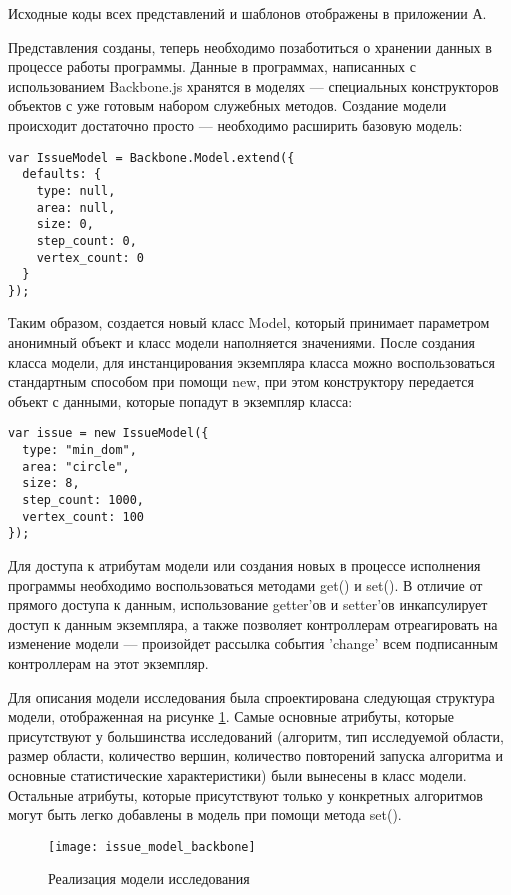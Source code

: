 Исходные коды всех представлений и шаблонов отображены в приложении А.

Представления созданы, теперь необходимо позаботиться о хранении данных в процессе работы программы. Данные в программах, написанных с использованием Backbone.js хранятся в моделях --- специальных конструкторов объектов с уже готовым набором служебных методов. Создание модели происходит достаточно просто --- необходимо расширить базовую модель:
\begin{lstlisting}
var IssueModel = Backbone.Model.extend({
  defaults: {
    type: null,
    area: null,
    size: 0,
    step_count: 0,
    vertex_count: 0
  }
});
\end{lstlisting}

Таким образом, создается новый класс Model, который принимает параметром анонимный объект и класс модели наполняется значениями. После создания класса модели, для инстанцирования экземпляра класса можно воспользоваться стандартным способом при помощи new, при этом конструктору передается объект с данными, которые попадут в экземпляр класса:
\begin{lstlisting}
var issue = new IssueModel({
  type: "min_dom",
  area: "circle",
  size: 8,
  step_count: 1000,
  vertex_count: 100
});
\end{lstlisting}

Для доступа к атрибутам модели или создания новых в процессе исполнения программы необходимо воспользоваться методами get() и set(). В отличие от прямого доступа к данным, использование getter'ов и setter'ов инкапсулирует доступ к данным экземпляра, а также позволяет контроллерам отреагировать на изменение модели --- произойдет рассылка события 'change' всем подписанным контроллерам на этот экземпляр.

Для описания модели исследования была спроектирована следующая структура модели, отображенная на рисунке \ref{issue_model_backbone}. Самые основные атрибуты, которые присутствуют у большинства исследований (алгоритм, тип исследуемой области, размер области, количество вершин, количество повторений запуска алгоритма и основные статистические характеристики) были вынесены в класс модели. Остальные атрибуты, которые присутствуют только у конкретных алгоритмов могут быть легко добавлены в модель при помощи метода set().

\begin{figure}[ht]
\center\texttt{[image: issue\_model\_backbone]}
\caption{Реализация модели исследования}\label{issue_model_backbone}
\end{figure}

